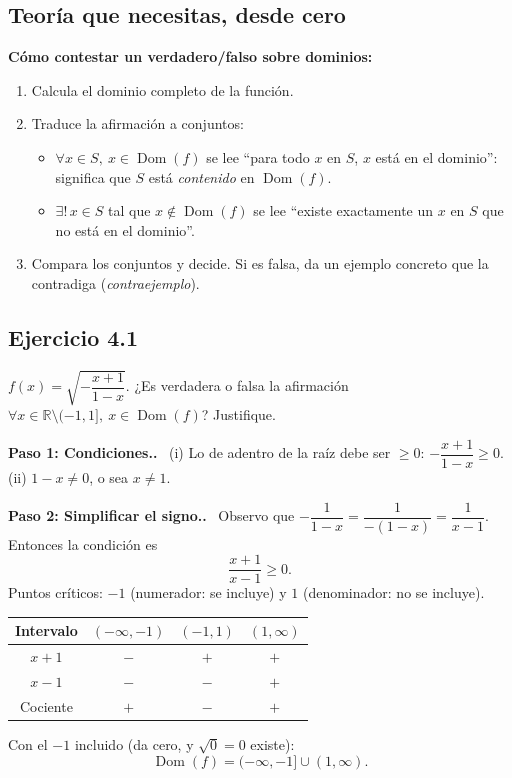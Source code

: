 \documentclass[11pt,a4paper]{article}
\newcommand{\R}{\mathbb{R}}
\newcommand{\dom}{\operatorname{Dom}}
\newcommand{\paso}[1]{\par\medskip\noindent\textbf{\textcolor{blue!50!black}{Paso #1.}}\ }
\begin{document}
\subsection{Teoría que necesitas, desde cero}

\begin{idea}
\textbf{Cómo contestar un verdadero/falso sobre dominios:}
\begin{enumerate}[nosep]
  \item Calcula el dominio completo de la función.
  \item Traduce la afirmación a conjuntos:
  \begin{itemize}[nosep]
    \item $\forall x\in S,\ x\in\dom(f)$ se lee ``para todo $x$ en $S$, $x$ está en el dominio'': significa que $S$ está \emph{contenido} en $\dom(f)$.
    \item $\exists!\,x\in S$ tal que $x\notin\dom(f)$ se lee ``existe exactamente un $x$ en $S$ que no está en el dominio''.
  \end{itemize}
  \item Compara los conjuntos y decide. Si es falsa, da un ejemplo concreto que la contradiga (\emph{contraejemplo}).
\end{enumerate}
\end{idea}

\subsection{Ejercicio 4.1}
\begin{enunciado}
$f(x)=\sqrt{-\dfrac{x+1}{1-x}}$. ¿Es verdadera o falsa la afirmación $\forall x\in\R\setminus(-1,1],\ x\in\dom(f)$? Justifique.
\end{enunciado}

\paso{1: Condiciones.} (i) Lo de adentro de la raíz debe ser $\ge0$: $-\dfrac{x+1}{1-x}\ge0$. (ii) $1-x\ne0$, o sea $x\ne1$.

\paso{2: Simplificar el signo.} Observo que $-\dfrac1{1-x}=\dfrac1{-(1-x)}=\dfrac1{x-1}$. Entonces la condición es
\[ \frac{x+1}{x-1}\ge0. \]
Puntos críticos: $-1$ (numerador: se incluye) y $1$ (denominador: no se incluye).
\begin{center}
\begin{tabular}{c|ccc}
Intervalo & $(-\infty,-1)$ & $(-1,1)$ & $(1,\infty)$\\ \hline
$x+1$ & $-$ & $+$ & $+$\\
$x-1$ & $-$ & $-$ & $+$\\ \hline
Cociente & $+$ & $-$ & $+$
\end{tabular}
\end{center}
Con el $-1$ incluido (da cero, y $\sqrt0=0$ existe):
\[ \dom(f)=(-\infty,-1]\cup(1,\infty). \]
\end{document}
